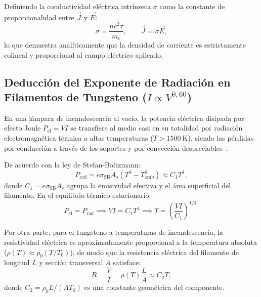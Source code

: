 \begin{appendices}
Definiendo la conductividad eléctrica intrínseca $\sigma$ como la constante de proporcionalidad entre $\vec{J}$ y $\vec{E}$:
\begin{equation}
    \boxed{\sigma = \frac{n e^2 \tau}{m_e}, \qquad \vec{J} = \sigma \vec{E},}
    \label{eq:anexo_conductividad_drude}
\end{equation}
lo que demuestra analíticamente que la densidad de corriente es estrictamente colineal y proporcional al campo eléctrico aplicado.

\subsection{Deducción del Exponente de Radiación en Filamentos de Tungsteno (\texorpdfstring{$I \propto V^{0{,}60}$}{I proporcional a V a la 0.60})}
En una lámpara de incandescencia al vacío, la potencia eléctrica disipada por efecto Joule $P_{\text{el}} = V I$ se transfiere al medio casi en su totalidad por radiación electromagnética térmica a altas temperaturas ($T > \qty{1500}{\kelvin}$), siendo las pérdidas por conducción a través de los soportes y por convección despreciables~\cite{serway}.

De acuerdo con la ley de Stefan-Boltzmann:
\begin{equation}
    P_{\text{rad}} = e \sigma_{\text{SB}} A_s \left( T^4 - T_{\text{amb}}^4 \right) \approx C_1 T^4,
    \label{eq:anexo_stefan}
\end{equation}
donde $C_1 = e \sigma_{\text{SB}} A_s$ agrupa la emisividad efectiva y el área superficial del filamento. En el equilibrio térmico estacionario:
\begin{equation}
    P_{\text{el}} = P_{\text{rad}} \implies V I = C_1 T^4 \implies T = \left( \frac{V I}{C_1} \right)^{1/4}.
    \label{eq:anexo_temperatura_potencia}
\end{equation}

Por otra parte, para el tungsteno a temperaturas de incandescencia, la resistividad eléctrica es aproximadamente proporcional a la temperatura absoluta ($\rho(T) \approx \rho_0 (T/T_0)$), de modo que la resistencia eléctrica del filamento de longitud $L$ y sección transversal $A$ satisface:
\begin{equation}
    R = \frac{V}{I} = \rho(T)\frac{L}{A} \approx C_2 T,
    \label{eq:anexo_resistencia_temperatura}
\end{equation}
donde $C_2 = \rho_0 L / (A T_0)$ es una constante geométrica del componente.


\end{appendices}
